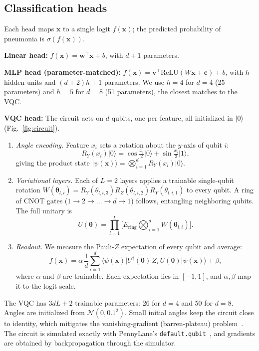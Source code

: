 \documentclass[conference]{IEEEtran}
\begin{document}
\subsection{Classification heads}
Each head maps $\mathbf{x}$ to a single logit $f(\mathbf{x})$; the
predicted probability of pneumonia is $\sigma(f(\mathbf{x}))$.

\textbf{Linear head:} $f(\mathbf{x})=\mathbf{w}^\top\mathbf{x}+b$, with $d+1$
parameters.

\textbf{MLP head (parameter-matched):}
$f(\mathbf{x})=\mathbf{v}^\top\mathrm{ReLU}(W\mathbf{x}+\mathbf{c})+b$,
with $h$ hidden units and $(d+2)h+1$ parameters. We use $h=4$ for $d=4$
(25 parameters) and $h=5$ for $d=8$ (51 parameters), the closest matches to
the VQC.

\textbf{VQC head:} The circuit acts on $d$ qubits, one per feature, all
initialized in $\lvert0\rangle$ (Fig.~\ref{fig:circuit}).
\begin{enumerate}
\item \emph{Angle encoding.} Feature $x_i$ sets a rotation about the
$y$-axis of qubit $i$:
\begin{equation}
R_Y(x_i)\lvert0\rangle=\cos\tfrac{x_i}{2}\lvert0\rangle+\sin\tfrac{x_i}{2}\lvert1\rangle,
\end{equation}
giving the product state
$\lvert\psi(\mathbf{x})\rangle=\bigotimes_{i=1}^{d}R_Y(x_i)\lvert0\rangle$.
\item \emph{Variational layers.} Each of $L=2$ layers applies a trainable
single-qubit rotation
$W(\boldsymbol{\theta}_{l,i})=R_Y(\theta_{l,i,3})R_Z(\theta_{l,i,2})R_Y(\theta_{l,i,1})$
to every qubit. A ring of CNOT gates
($1\!\to\!2\!\to\!\dots\!\to\!d\!\to\!1$) follows, entangling neighboring
qubits. The full unitary is
\begin{equation}
U(\boldsymbol{\theta})=\prod_{l=1}^{L}\Big[E_{\mathrm{ring}}\bigotimes_{i=1}^{d}W(\boldsymbol{\theta}_{l,i})\Big].
\end{equation}
\item \emph{Readout.} We measure the Pauli-$Z$ expectation of every qubit
and average:
\begin{equation}
f(\mathbf{x})=\alpha\,\frac{1}{d}\sum_{i=1}^{d}
\langle\psi(\mathbf{x})\rvert U^\dagger(\boldsymbol{\theta})\,Z_i\,U(\boldsymbol{\theta})\lvert\psi(\mathbf{x})\rangle+\beta,
\end{equation}
where $\alpha$ and $\beta$ are trainable. Each expectation lies in
$[-1,1]$, and $\alpha,\beta$ map it to the logit scale.
\end{enumerate}
The VQC has $3dL+2$ trainable parameters: 26 for $d=4$ and 50 for $d=8$.
Angles are initialized from $\mathcal{N}(0,0.1^2)$. Small initial angles
keep the circuit close to identity, which mitigates the vanishing-gradient
(barren-plateau) problem~\cite{mcclean2018}. The circuit is simulated
exactly with PennyLane's \texttt{default.qubit}~\cite{bergholm2018}, and
gradients are obtained by backpropagation through the simulator.
\end{document}
